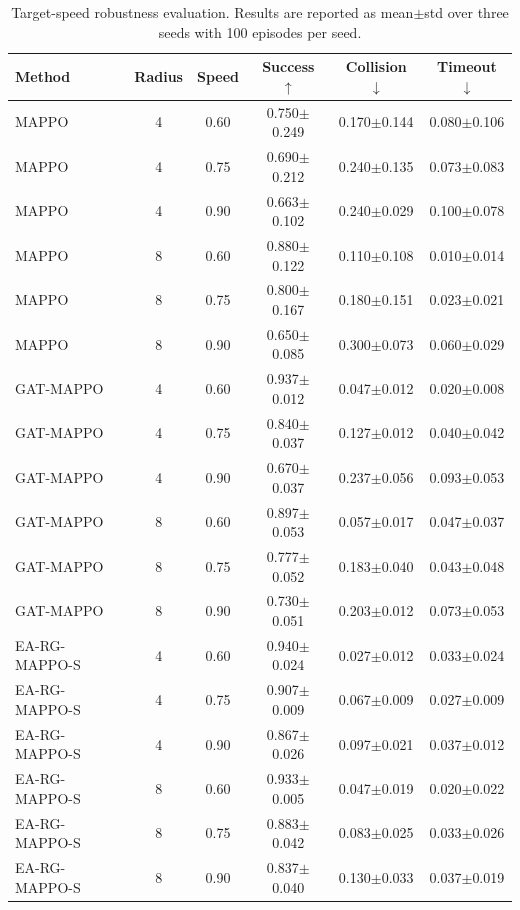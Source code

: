 \begin{table}[t]
\centering
\caption{Target-speed robustness evaluation. Results are reported as mean$\pm$std over three seeds with 100 episodes per seed.}
\label{tab:speed_robustness}
\begin{tabular}{lccccc}
\toprule
Method & Radius & Speed & Success $\uparrow$ & Collision $\downarrow$ & Timeout $\downarrow$ \\
\midrule
MAPPO & 4 & 0.60 & 0.750$\pm$0.249 & 0.170$\pm$0.144 & 0.080$\pm$0.106 \\
MAPPO & 4 & 0.75 & 0.690$\pm$0.212 & 0.240$\pm$0.135 & 0.073$\pm$0.083 \\
MAPPO & 4 & 0.90 & 0.663$\pm$0.102 & 0.240$\pm$0.029 & 0.100$\pm$0.078 \\
MAPPO & 8 & 0.60 & 0.880$\pm$0.122 & 0.110$\pm$0.108 & 0.010$\pm$0.014 \\
MAPPO & 8 & 0.75 & 0.800$\pm$0.167 & 0.180$\pm$0.151 & 0.023$\pm$0.021 \\
MAPPO & 8 & 0.90 & 0.650$\pm$0.085 & 0.300$\pm$0.073 & 0.060$\pm$0.029 \\
\midrule
GAT-MAPPO & 4 & 0.60 & 0.937$\pm$0.012 & 0.047$\pm$0.012 & 0.020$\pm$0.008 \\
GAT-MAPPO & 4 & 0.75 & 0.840$\pm$0.037 & 0.127$\pm$0.012 & 0.040$\pm$0.042 \\
GAT-MAPPO & 4 & 0.90 & 0.670$\pm$0.037 & 0.237$\pm$0.056 & 0.093$\pm$0.053 \\
GAT-MAPPO & 8 & 0.60 & 0.897$\pm$0.053 & 0.057$\pm$0.017 & 0.047$\pm$0.037 \\
GAT-MAPPO & 8 & 0.75 & 0.777$\pm$0.052 & 0.183$\pm$0.040 & 0.043$\pm$0.048 \\
GAT-MAPPO & 8 & 0.90 & 0.730$\pm$0.051 & 0.203$\pm$0.012 & 0.073$\pm$0.053 \\
\midrule
EA-RG-MAPPO-S & 4 & 0.60 & 0.940$\pm$0.024 & 0.027$\pm$0.012 & 0.033$\pm$0.024 \\
EA-RG-MAPPO-S & 4 & 0.75 & 0.907$\pm$0.009 & 0.067$\pm$0.009 & 0.027$\pm$0.009 \\
EA-RG-MAPPO-S & 4 & 0.90 & 0.867$\pm$0.026 & 0.097$\pm$0.021 & 0.037$\pm$0.012 \\
EA-RG-MAPPO-S & 8 & 0.60 & 0.933$\pm$0.005 & 0.047$\pm$0.019 & 0.020$\pm$0.022 \\
EA-RG-MAPPO-S & 8 & 0.75 & 0.883$\pm$0.042 & 0.083$\pm$0.025 & 0.033$\pm$0.026 \\
EA-RG-MAPPO-S & 8 & 0.90 & 0.837$\pm$0.040 & 0.130$\pm$0.033 & 0.037$\pm$0.019 \\
\bottomrule
\end{tabular}
\end{table}
